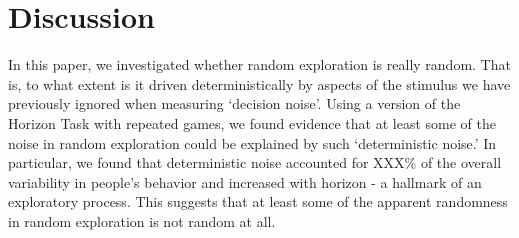 \documentclass[12pt]{article}
\begin{document}
	
	
	
	\section*{Discussion}
	
	
	
	In this paper, we investigated whether random exploration is really random. That is, to what extent is it driven deterministically by aspects of the stimulus we have previously ignored when measuring `decision noise'.  Using a version of the Horizon Task with repeated games, we found evidence that at least some of the noise in random exploration could be explained by such `deterministic noise.' In particular, we found that deterministic noise accounted for XXX\% of the overall variability in people's behavior and increased with horizon - a hallmark of an exploratory process. This suggests that at least some of the apparent randomness in random exploration is not random at all.
	
\end{document}
